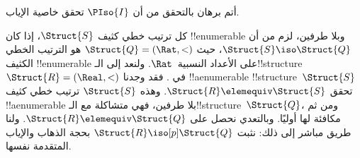 \documentclass[../../../include/open-logic-section]{subfiles}
\begin{document}
\begin{prob}
  أتم برهان  بالتحقق من أن
  $\PIso{I}$ تحقق خاصية الإياب.
\end{prob}

\begin{rem}
  كل ترتيب خطي كثيف $\Struct{S}$، إذا كان !!{enumerable} وبلا
  طرفين، لزم من  أن $\Struct{S} \iso \Struct{Q}$،
  حيث $\Struct{Q} = (\Rat, <)$ هو الترتيب الخطي الكثيف
  !!{enumerable} على الأعداد النسبية~$\Rat$. ولنعد إلى
  الـ!!{structure}~$\Struct{R} = (\Real, <)$ في
  . فقد وجدنا !!a{enumerable}
  !!{structure}~$\Struct{S}$ تحقق $\Struct{R} \elemequiv \Struct{S}$.
  وهذه $\Struct{S}$ ترتيب خطي كثيف !!a{enumerable} بلا طرفين،
  فهي متشاكلة مع الـ!!{structure}~$\Struct{Q}$، ومن ثم مكافئة
  لها أوليًا. وبالتعدي نحصل على $\Struct{R} \elemequiv \Struct{Q}$.
  ولنا طريق مباشر إلى ذلك: نثبت $\Struct{R} \iso[p] \Struct{Q}$
  بحجة الذهاب والإياب المتقدمة نفسها.
\end{rem}
\end{document}
